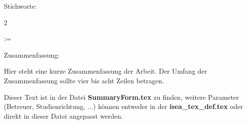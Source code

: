 \vspace{5mm}

Stichworte:
\begin{multicols}{2}
	\begin{itemize}
		\itemsep 0pt
		\makeatletter
		\@for\tmp:=\varKeywords\do{\item \tmp}
		\makeatother
	\end{itemize}
\end{multicols}


\vspace{5mm}

Zusammenfassung:


Hier steht eine kurze Zusammenfassung der Arbeit. Der Umfang der Zusammenfassung sollte vier bis acht Zeilen betragen.

Dieser Text ist in der Datei \textbf{SummaryForm.tex} zu finden, weitere Parameter (Betreuer, Studienrichtung, ...) können entweder in der \textbf{isea\_tex\_def.tex} oder direkt in dieser Datei angepasst werden.


\cleardoubleemptypage
\normalsize

